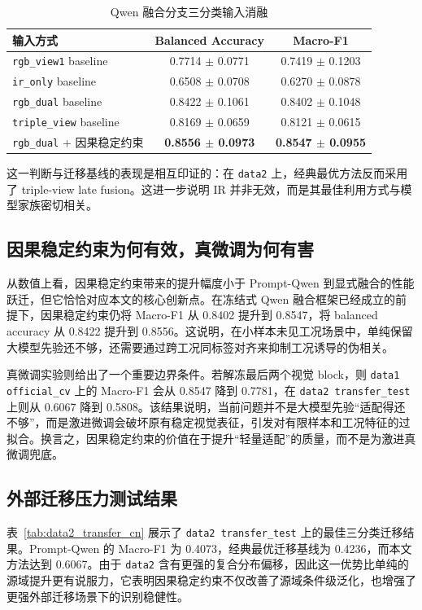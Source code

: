 \begin{table}[!t]
\caption{Qwen 融合分支三分类输入消融}
\label{tab:ablation_cn}
\centering
\begin{tabular}{|l|c|c|}
\hline
输入方式 & Balanced Accuracy & Macro-F1 \\
\hline
\texttt{rgb\_view1} baseline & 0.7714 $\pm$ 0.0771 & 0.7419 $\pm$ 0.1203 \\
\hline
\texttt{ir\_only} baseline & 0.6508 $\pm$ 0.0708 & 0.6270 $\pm$ 0.0878 \\
\hline
\texttt{rgb\_dual} baseline & 0.8422 $\pm$ 0.1061 & 0.8402 $\pm$ 0.1048 \\
\hline
\texttt{triple\_view} baseline & 0.8169 $\pm$ 0.0659 & 0.8121 $\pm$ 0.0615 \\
\hline
\texttt{rgb\_dual} + 因果稳定约束 & \textbf{0.8556 $\pm$ 0.0973} & \textbf{0.8547 $\pm$ 0.0955} \\
\hline
\end{tabular}
\end{table}

这一判断与迁移基线的表现是相互印证的：在 \texttt{data2} 上，经典最优方法反而采用了 triple-view late fusion。这进一步说明 IR 并非无效，而是其最佳利用方式与模型家族密切相关。

\subsection{因果稳定约束为何有效，真微调为何有害}
从数值上看，因果稳定约束带来的提升幅度小于 Prompt-Qwen 到显式融合的性能跃迁，但它恰恰对应本文的核心创新点。在冻结式 Qwen 融合框架已经成立的前提下，因果稳定约束仍将 Macro-F1 从 0.8402 提升到 0.8547，将 balanced accuracy 从 0.8422 提升到 0.8556。这说明，在小样本未见工况场景中，单纯保留大模型先验还不够，还需要通过跨工况同标签对齐来抑制工况诱导的伪相关。

真微调实验则给出了一个重要边界条件。若解冻最后两个视觉 block，则 \texttt{data1 official\_cv} 上的 Macro-F1 会从 0.8547 降到 0.7781，在 \texttt{data2 transfer\_test} 上则从 0.6067 降到 0.5808。该结果说明，当前问题并不是大模型先验“适配得还不够”，而是激进微调会破坏原有稳定视觉表征，引发对有限样本和工况特征的过拟合。换言之，因果稳定约束的价值在于提升“轻量适配”的质量，而不是为激进真微调兜底。

\subsection{外部迁移压力测试结果}
表~\ref{tab:data2_transfer_cn} 展示了 \texttt{data2 transfer\_test} 上的最佳三分类迁移结果。Prompt-Qwen 的 Macro-F1 为 0.4073，经典最优迁移基线为 0.4236，而本文方法达到 0.6067。由于 \texttt{data2} 含有更强的复合分布偏移，因此这一优势比单纯的源域提升更有说服力，它表明因果稳定约束不仅改善了源域条件级泛化，也增强了更强外部迁移场景下的识别稳健性。


